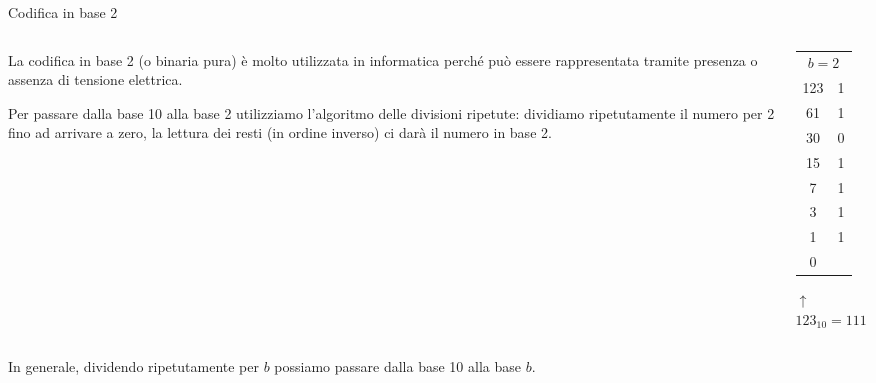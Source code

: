 \documentclass[aspectratio=169, ]{beamer}
\begin{document}
\begin{frame}{Codifica in base 2}
    \begin{columns}
        \begin{column}{0.7\textwidth}
            La codifica in base 2 (o binaria pura) è molto utilizzata in informatica perché può essere rappresentata tramite presenza o assenza di tensione elettrica.

            Per passare dalla base 10 alla base 2 utilizziamo l'algoritmo delle \alert{divisioni ripetute}: dividiamo ripetutamente il numero per 2 fino ad arrivare a zero, la lettura dei resti (in ordine inverso) ci darà il numero in base 2.
        \end{column}

        \begin{column}{0.2\textwidth}

            \pause

            \begin{tabular}{c|c}
                \multicolumn{2}{c}{$b=2$}\\
                123 & 1 \\
                61  & 1 \\
                30  & 0 \\
                15  & 1 \\
                7   & 1 \\
                3   & 1 \\
                1	& 1	\\
                0   &  \\
            \end{tabular}
            $\uparrow$
            $123_{10} = 1111011_2$
        \end{column}
    \end{columns}

In generale, dividendo ripetutamente per $b$ possiamo passare dalla base 10 alla base $b$.
\end{frame}
\end{document}
